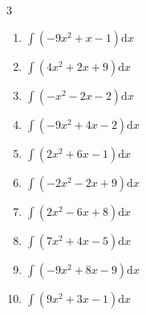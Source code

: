 \begin{multicols}{3}
\begin{enumerate}
\resetques

  \item $\displaystyle \int \left( -9x^{2}+x-1 \right) \mathrm{d}x$


  \item $\displaystyle \int \left( 4x^{2}+2x+9 \right) \mathrm{d}x$


  \item $\displaystyle \int \left( -x^{2}-2x-2 \right) \mathrm{d}x$


  \item $\displaystyle \int \left( -9x^{2}+4x-2 \right) \mathrm{d}x$


  \item $\displaystyle \int \left( 2x^{2}+6x-1 \right) \mathrm{d}x$


  \item $\displaystyle \int \left( -2x^{2}-2x+9 \right) \mathrm{d}x$


  \item $\displaystyle \int \left( 2x^{2}-6x+8 \right) \mathrm{d}x$


  \item $\displaystyle \int \left( 7x^{2}+4x-5 \right) \mathrm{d}x$


  \item $\displaystyle \int \left( -9x^{2}+8x-9 \right) \mathrm{d}x$


  \item $\displaystyle \int \left( 9x^{2}+3x-1 \right) \mathrm{d}x$


\columnbreak %


\end{enumerate}
\end{multicols}
